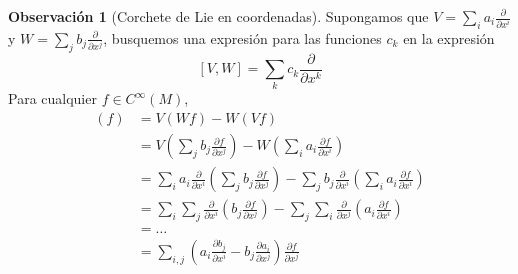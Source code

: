 \documentclass[spanish]{book}
\theoremstyle{definition}
\newtheorem*{obs}{Observación}
\newcommand{\Cinf}{C^\infty}
\begin{document}
	\begin{obs}[Corchete de Lie en coordenadas]
		Supongamos que $V=\sum_ia_i\frac{\partial}{\partial x^i}$ y $W=\sum_jb_j\frac{\partial}{\partial x^j}$, busquemos una expresión para las funciones $c_k$ en la expresión \[[V,W]=\sum_kc_k\frac{\partial}{\partial x^k}\]
		Para cualquier $f\in\Cinf(M)$,
		\begin{align*}
			[V,W](f)&=V(Wf)-W(Vf)\\
			&=V\left(\sum_jb_j\frac{\partial f}{\partial x^j}\right)-W\left(\sum_ia_i\frac{\partial f}{\partial x^i}\right)\\
			&=\sum_ia_i\frac{\partial }{\partial x^i}\left(\sum_jb_j\frac{\partial f}{\partial x^j}\right)-\sum_jb_j\frac{\partial }{\partial x^i}\left(\sum_ia_i\frac{\partial f}{\partial x^i}\right)\\
			&=\sum_i\sum_j\frac{\partial}{\partial x^i}\left(b_j\frac{\partial f}{\partial x^j}\right)-\sum_j\sum_i\frac{\partial}{\partial x^j}\left(a_i\frac{\partial f}{\partial x^i}\right)\\
			&=\ldots\\
			&=\sum_{i,j}\left(a_i\frac{\partial b_j}{\partial x^i}-b_j\frac{\partial a_i}{\partial x^j}\right)\frac{\partial f}{\partial x^j}
		\end{align*}
	\end{obs}
\end{document}
